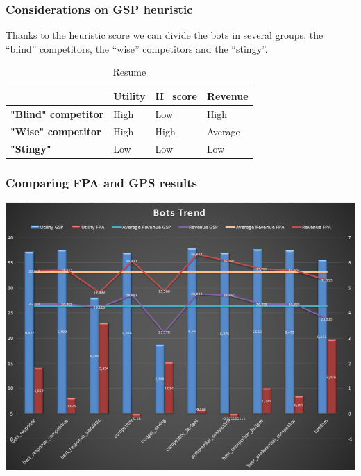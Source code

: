 \documentclass{beamer}
\begin{document}
\begin{frame}
\frametitle{Considerations on GSP heuristic}
Thanks to the heuristic score  we can divide the bots in several groups, the ``blind'' competitors, the ``wise'' competitors and  the ``stingy''.\\
\begin{table}[]
\centering
\begin{tabular}{l|l|l|l|}
\cline{2-4}
                                                  & \textbf{Utility} & \textbf{H\_score} & \textbf{Revenue} \\ \hline
\multicolumn{1}{|l|}{\textbf{"Blind" competitor}} & High             & Low               & High             \\ \hline
\multicolumn{1}{|l|}{\textbf{"Wise" competitor}}  & High             & High              & Average          \\ \hline
\multicolumn{1}{|l|}{\textbf{"Stingy"}}           & Low              & Low               & Low              \\ \hline
\end{tabular}
\caption{Resume}
\label{my-label}
\end{table}
\end{frame}


\begin{frame}
\frametitle{Comparing FPA and GPS results}
\begin{center}
\includegraphics[scale=0.46]{img/Auctions/Combined_Utility.PNG} 
\end{center}
\end{frame}
\end{document}
